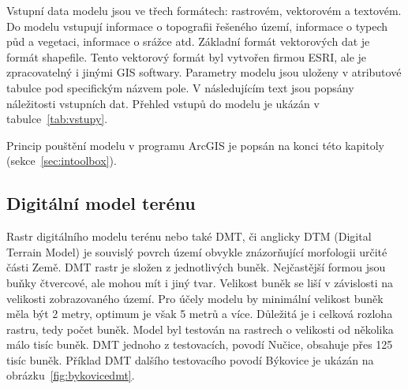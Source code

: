 



Vstupní data modelu jsou ve třech formátech: rastrovém, vektorovém a textovém. Do modelu vstupují informace o topografii řešeného území, informace o typech půd a vegetaci, informace o srážce atd. Základní formát vektorových dat je formát shapefile. Tento vektorový formát byl vytvořen firmou ESRI, ale je zpracovatelný i jinými GIS softwary. Parametry modelu jsou uloženy v atributové tabulce pod specifickým názvem pole. 
V následujícím text jsou popsány náležitosti vstupních dat. 
% 
Přehled vstupů do modelu je ukázán v tabulce~\ref{tab:vstupy}.


Princip pouštění modelu \smod v programu ArcGIS je popsán na konci této kapitoly (sekce~\ref{sec:intoolbox}). 
% 





% 

















\subsection{Digitální model terénu} \label{sec:vstupdmt} 

Rastr digitálního modelu terénu nebo také DMT, či anglicky DTM (Digital Terrain Model) je souvislý povrch území obvykle znázorňující morfologii určité části Země. DMT rastr je složen z jednotlivých buněk. Nejčastější formou jsou buňky čtvercové, ale mohou mít i jiný tvar.  Velikost buněk se liší v závislosti na velikosti zobrazovaného území. Pro účely modelu \smod by minimální velikost buněk měla být 2 metry, optimum je však 5 metrů a více. Důležitá je i celková rozloha rastru, tedy počet buněk. Model byl testován na rastrech o velikosti od několika málo tisíc buněk. DMT jednoho z testovacích, povodí Nučice, obsahuje přes 125 tisíc buněk. Příklad DMT dalšího testovacího povodí Býkovice je ukázán na obrázku~\ref{fig:bykovicedmt}.


